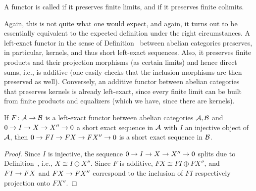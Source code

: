 \documentclass[a4paper,parskip=half,numbers=enddot, DIV=12]{scrreprt}
\begin{document}
\begin{defi}
	A functor is called  if it preserves finite limits, and  if it preserves finite colimits.
\end{defi}
\begin{rem}
	Again, this is not quite what one would expect, and again, it turns out to be essentially equivalent to the expected definition under the right circumstances. A left-exact functor in the sense of Definition~ between abelian categories preserves, in particular, kernels, and thus short left-exact sequences. Also, it preserves finite products and their projection morphisms (as certain limits) and hence direct sums, i.e., is additive (one easily checks that the inclusion morphisms are then preserved as well). Conversely, an additive functor between abelian categories that preserves kernels is already left-exact, since every finite limit can be built from finite products and equalizers (which we have, since there are kernels).
\end{rem}
\begin{prop}
	If $F\colon \Aa\morphism\Bb$ is a left-exact functor between abelian categories $\mathcal{A},\mathcal{B}$ and $0\morphism I\morphism X\morphism X''\morphism 0$ a short exact sequence in $\mathcal{A}$ with $I$ an injective object of $\mathcal{A}$, then $0\morphism FI\morphism FX\morphism FX''\morphism 0$ is a short exact sequence in $\mathcal{B}$.
\end{prop}
\begin{proof}
	Since $I$ is injective, the sequence $0\morphism I\morphism X\morphism X''\morphism 0$ splits due to Definition~, i.e., $X\cong I\oplus X''$. Since $F$ is additive, $FX\cong FI\oplus FX''$, and $FI\morphism FX$ and $FX\morphism FX''$ correspond to the inclusion of $FI$ respectively projection onto $FX''$.
\end{proof}
\end{document}
